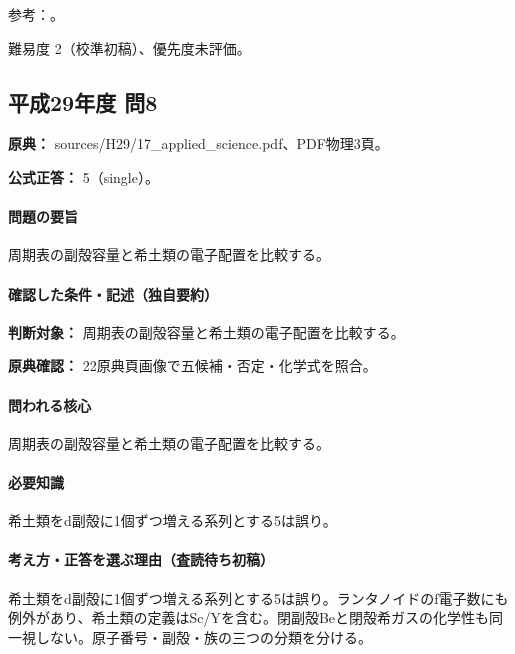 \par 参考：\cite{inorganic_alkali,atomic_nist2019}。

\par 難易度 2（校準初稿）、優先度未評価。

\subsection{平成29年度 問8}
\label{q:h29-reg-applied-08}

\noindent\textbf{原典：} sources/H29/17\_applied\_science.pdf、PDF物理3頁。

\textbf{公式正答：} 5（single）。

\paragraph{問題の要旨} 周期表の副殻容量と希土類の電子配置を比較する。

\paragraph{確認した条件・記述（独自要約）}\mbox{}\par

\noindent\textbf{判断対象：} 周期表の副殻容量と希土類の電子配置を比較する。\par

\noindent\textbf{原典確認：} 22原典頁画像で五候補・否定・化学式を照合。\par

\paragraph{問われる核心} 周期表の副殻容量と希土類の電子配置を比較する。

\paragraph{必要知識} 希土類をd副殻に1個ずつ増える系列とする5は誤り。

\paragraph{考え方・正答を選ぶ理由（査読待ち初稿）} 希土類をd副殻に1個ずつ増える系列とする5は誤り。ランタノイドのf電子数にも例外があり、希土類の定義はSc/Yを含む。閉副殻Beと閉殻希ガスの化学性も同一視しない。原子番号・副殻・族の三つの分類を分ける。

